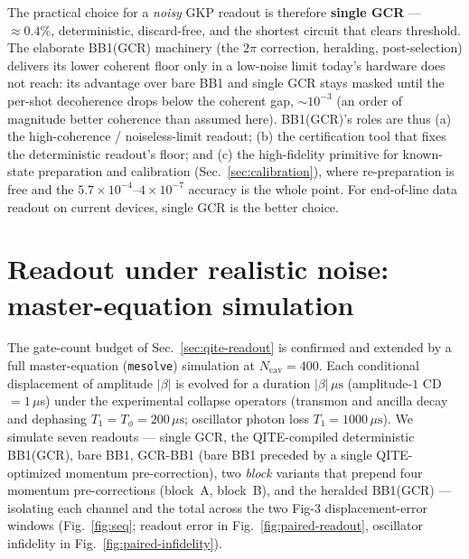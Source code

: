 \documentclass[11pt]{article}
\begin{document}
The practical choice for a \emph{noisy} GKP readout is therefore \textbf{single GCR} ---
$\approx\!0.4\%$, deterministic, discard-free, and the shortest circuit that clears threshold. The elaborate BB1(GCR) machinery (the $2\pi$ correction, heralding,
post-selection) delivers its lower coherent floor only in a low-noise limit today's hardware does not
reach: its advantage over bare BB1 and single GCR stays masked until the per-shot decoherence drops
below the coherent gap, $\sim\!10^{-3}$ (an order of magnitude better coherence than assumed here).
BB1(GCR)'s roles are thus (a) the high-coherence / noiseless-limit readout; (b) the certification tool
that fixes the deterministic readout's floor; and (c) the high-fidelity primitive for known-state
preparation and calibration (Sec.~\ref{sec:calibration}), where re-preparation is free and the
$5.7\times10^{-4}$--$4\times10^{-7}$ accuracy is the whole point. For end-of-line data readout on
current devices, single GCR is the better choice.

\section{Readout under realistic noise: master-equation simulation}\label{sec:mesolve}
The gate-count budget of Sec.~\ref{sec:qite-readout} is confirmed and extended by a full
master-equation (\texttt{mesolve}) simulation at $N_{\mathrm{cav}}=400$. Each conditional displacement
of amplitude $|\beta|$ is evolved for a duration $|\beta|\,\mu\mathrm{s}$ (amplitude-$1$ CD $=1\,\mu$s)
under the experimental collapse operators (transmon and ancilla decay and dephasing
$T_1=T_\phi=200\,\mu\mathrm{s}$; oscillator photon loss $T_1=1000\,\mu\mathrm{s}$). We simulate seven
readouts --- single GCR, the QITE-compiled deterministic BB1(GCR), bare BB1, GCR-BB1 (bare BB1 preceded
by a single QITE-optimized momentum pre-correction), two \emph{block} variants that prepend four momentum
pre-corrections (block~A, block~B), and the heralded BB1(GCR)
--- isolating each channel and the total across the two Fig-3 displacement-error windows
(Fig.~\ref{fig:seq}; readout error in Fig.~\ref{fig:paired-readout}, oscillator infidelity in
Fig.~\ref{fig:paired-infidelity}).
\end{document}
